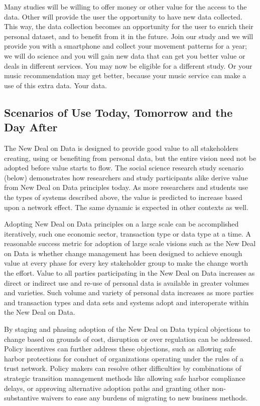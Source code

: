Many studies will be willing to offer money or other value for the access to the data.
Other will provide the user the opportunity to have new data collected.
This way, the data collection becomes an opportunity for the user to enrich their personal dataset, and to benefit from it in the future.
Join our study and we will provide you with a smartphone and collect your movement patterns for a year; we will do science and you will gain new data that can get you better value or deals in different services.
You may now be eligible for a different study.
Or your music recommendation may get better, because your music service can make a use of this extra data.
Your data.

 \subsection{Scenarios of Use Today, Tomorrow and the Day After}


The New Deal on Data is designed to provide good value to all stakeholders creating, using or benefiting from personal data, but the entire vision need not be adopted before value starts to flow. The social science research study scenario (below) demonstrates how researchers and study participants alike derive value from New Deal on Data principles today.  As more researchers and students use the types of systems described above, the value is predicted to increase based upon a network effect.  The same dynamic is expected in other contexts as well. 

Adopting New Deal on Data principles on a large scale can be accomplished iteratively, such one economic sector, transaction type or data type at a time.  A reasonable success metric for adoption of large scale visions such as the New Deal on Data is whether change management has been designed to achieve enough value at every phase for every key stakeholder group to make the change worth the effort.  Value to all parties participating in the New Deal on Data increases as direct or indirect use and re-use of personal data is available in greater volumes and varieties.  Such volume and variety of personal data increases as more parties and transaction types and data sets and systems adopt and interoperate within the New Deal on Data.    

By staging and phasing adoption of the New Deal on Data typical objections to change based on grounds of cost, disruption or over regulation can be addressed.
Policy incentives can further address these objections, such as allowing safe harbor protections for conduct of organizations operating under the rules of a trust network.
Policy makers can resolve other difficulties by combinations of strategic transition management methods like allowing safe harbor compliance delays, or approving alternative adoption paths and granting other non-substantive waivers to ease any burdens of migrating to new business methods.   
 
